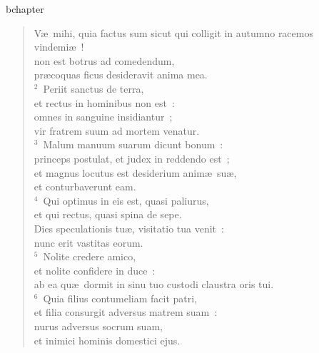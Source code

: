 bchapter\begin{verse}\vspace{-19pt}V\ae\ mihi, quia factus sum sicut qui colligit in autumno racemos vindemi\ae~!\\ non est botrus ad comedendum,\\ pr\ae coquas ficus desideravit anima mea.\\
${}^{2}$~Periit sanctus de terra,\\ et rectus in hominibus non est~:\\ omnes in sanguine insidiantur~;\\ vir fratrem suum ad mortem venatur.\\
${}^{3}$~Malum manuum suarum dicunt bonum~:\\ princeps postulat, et judex in reddendo est~;\\ et magnus locutus est desiderium anim\ae\ su\ae ,\\ et conturbaverunt eam.\\
${}^{4}$~Qui optimus in eis est, quasi paliurus,\\ et qui rectus, quasi spina de sepe.\\ Dies speculationis tu\ae , visitatio tua venit~:\\ nunc erit vastitas eorum.\\
${}^{5}$~Nolite credere amico,\\ et nolite confidere in duce~:\\ ab ea qu\ae\ dormit in sinu tuo custodi claustra oris tui.\\
${}^{6}$~Quia filius contumeliam facit patri,\\ et filia consurgit adversus matrem suam~:\\ nurus adversus socrum suam,\\ et inimici hominis domestici ejus.\end{verse}



